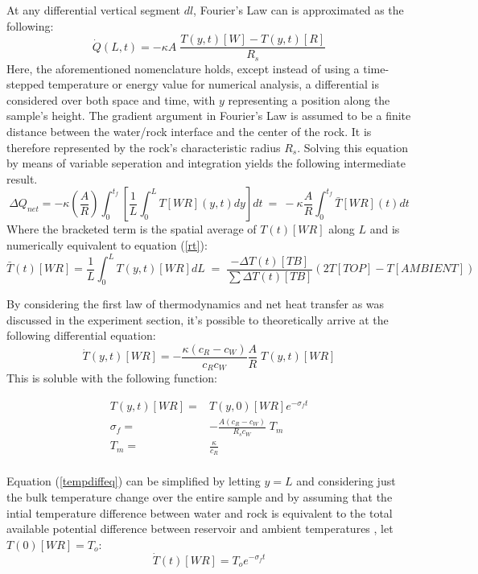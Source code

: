 At any differential vertical segment $dl$, Fourier's Law can is approximated as the following:
\begin{equation}\label{fouiers}
 \dot{Q}(L,t)=-\kappa A\;\frac{T(y,t)[W]-T(y,t)[R]}{R_{s}}
\end{equation}
Here, the aforementioned nomenclature holds, except instead of using a time-stepped temperature or energy value for numerical analysis, a differential is considered over both space and time, with $y$ representing a position along the sample's height. The gradient argument in Fourier's Law is assumed to be a finite distance between the water/rock interface and the center of the rock. It is therefore represented by the rock's characteristic radius $R_{s}$. Solving this equation by means of variable seperation and integration yields the following intermediate result.
\begin{equation}\label{Tbar}
\Delta Q_{net}=-\kappa\left(\dfrac{A}{R}\right) \int_{0}^{t_{f}} \left[ \dfrac{1}{L}\int_{0}^{L} T[WR](y,t)dy \right]dt\:=\:-\kappa\frac{A}{R}\int_{0}^{t_{f}}\bar{T}[WR](t)dt
\end{equation}
Where the bracketed term is the spatial average of $T(t)[WR]$ along $L$ and is numerically equivalent to equation (\ref{rt}):
\begin{equation}\label{spatialT}
 \bar{T}(t)[WR]=\frac{1}{L}\int_{0}^{L}T(y,t)[WR]dL\;=\;\dfrac{-\Delta T(t)[TB]}{\sum\Delta T(t)[TB]}\left(2T[TOP]-T[AMBIENT]\right)
\end{equation}

By considering the first law of thermodynamics and net heat transfer as was discussed in the experiment section, it's possible to theoretically arrive at the following differential equation\cite{theoryKern}:
\begin{equation}\label{tempdiffeq}
 \dot{T}(y,t)[WR]=-\frac{\kappa(c_{R}-c_{W})}{c_{R}c_{W}}\frac{A}{R}\;T(y,t)[WR]
\end{equation}
This is soluble with the following function:
\begin{center}
\begin{equation}\label{solution}
\begin{aligned}
 T(y,t)[WR]=&T(y,0)[WR]e^{-\sigma_{f} t}\\
 \sigma_{f}=&-\frac{A(c_{R}-c_{W})}{R_{s}c_{W}}\;T_m\\
 T_m=&\frac{\kappa}{c_{R}}\\
\end{aligned}
\end{equation}
\end{center}
Equation (\ref{tempdiffeq}) can be simplified by letting $y=L$ and considering just the bulk temperature change over the entire sample and by assuming that the intial temperature difference between water and rock is equivalent to the total available potential difference between reservoir and ambient temperatures \cite{theoryKern}, let $T(0)[WR]=T_{o}$:
\begin{equation}\label{tempdiffeq2}
 \dot{T}(t)[WR]=T_{o}e^{-\sigma_{f} t}
\end{equation}

